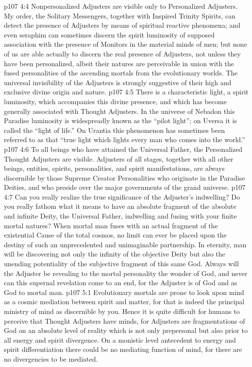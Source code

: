 \vs p107 4:4 \pc Nonpersonalized Adjusters are visible only to Personalized Adjusters. My order, the Solitary Messengers, together with Inspired Trinity Spirits, can detect the presence of Adjusters by means of spiritual reactive phenomena; and even seraphim can sometimes discern the spirit luminosity of supposed association with the presence of Monitors in the material minds of men; but none of us are able actually to discern the real presence of Adjusters, not unless they have been personalized, albeit their natures are perceivable in union with the fused personalities of the ascending mortals from the evolutionary worlds. The universal invisibility of the Adjusters is strongly suggestive of their high and exclusive divine origin and nature.
\vs p107 4:5 There is a characteristic light, a spirit luminosity, which accompanies this divine presence, and which has become generally associated with Thought Adjusters. In the universe of Nebadon this Paradise luminosity is widespreadly known as the “pilot light”; on Uversa it is called the “light of life.” On Urantia this phenomenon has sometimes been referred to as that “true light which lights every man who comes into the world.”
\vs p107 4:6 To all beings who have attained the Universal Father, the Personalized Thought Adjusters are visible. Adjusters of all stages, together with all other beings, entities, spirits, personalities, and spirit manifestations, are always discernible by those Supreme Creator Personalities who originate in the Paradise Deities, and who preside over the major governments of the grand universe.
\vs p107 4:7 \pc Can you really realize the true significance of the Adjuster’s indwelling? Do you really fathom what it means to have an absolute fragment of the absolute and infinite Deity, the Universal Father, indwelling and fusing with your finite mortal natures? When mortal man fuses with an actual fragment of the existential Cause of the total cosmos, no limit can ever be placed upon the destiny of such an unprecedented and unimaginable partnership. In eternity, man will be discovering not only the infinity of the objective Deity but also the unending potentiality of the subjective fragment of this same God. Always will the Adjuster be revealing to the mortal personality the wonder of God, and never can this supernal revelation come to an end, for the Adjuster is of God and as God to mortal man.
\vs p107 5:1 Evolutionary mortals are prone to look upon mind as a cosmic mediation between spirit and matter, for that is indeed the principal ministry of mind as discernible by you. Hence it is quite difficult for humans to perceive that Thought Adjusters have minds, for Adjusters are fragmentations of God on an absolute level of reality which is not only prepersonal but also prior to all energy and spirit divergence. On a monistic level antecedent to energy and spirit differentiation there could be no mediating function of mind, for there are no divergencies to be mediated.
